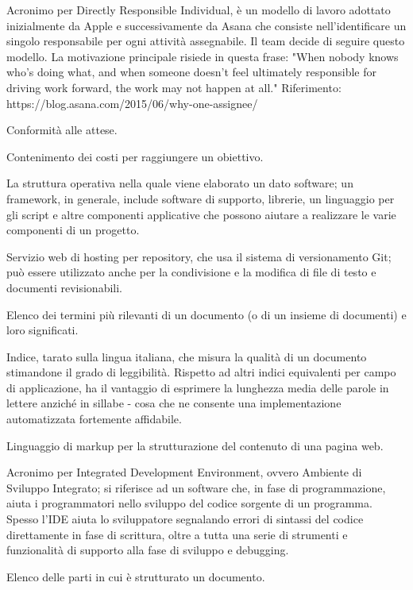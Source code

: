\item[DRI] Acronimo per Directly Responsible Individual, è un modello di lavoro adottato inizialmente da Apple e successivamente da Asana che consiste nell'identificare un singolo responsabile per ogni attività assegnabile. Il team decide di seguire questo modello. La motivazione principale risiede in questa frase: "When nobody knows who’s doing what, and when someone doesn’t feel ultimately responsible for driving work forward, the work may not happen at all." Riferimento: https://blog.asana.com/2015/06/why-one-assignee/ 
\item[Efficacia] Conformità alle attese.
\item[Efficienza] Contenimento dei costi per raggiungere un obiettivo.
\item[Framework]  La struttura operativa nella quale viene elaborato un dato software; un framework, in generale, include software di supporto, librerie, un linguaggio per gli script e altre componenti applicative che possono aiutare a realizzare le varie componenti di un progetto.
\item[GitHub] Servizio web di hosting per repository, che usa il sistema di versionamento Git; può essere utilizzato anche per la condivisione e la modifica di file di testo e documenti revisionabili.
\item[Glossario] Elenco dei termini più rilevanti di un documento (o di un insieme di documenti) e loro significati.
\item[Gulpease, indice di] Indice, tarato sulla lingua italiana, che misura la qualità di un documento stimandone il grado di leggibilità. Rispetto ad altri indici equivalenti per campo di applicazione, ha il vantaggio di esprimere la lunghezza media delle parole in lettere anziché in sillabe - cosa che ne consente una implementazione automatizzata fortemente affidabile. 
\item[HTML5] Linguaggio di markup per la strutturazione del contenuto di una pagina web.
\item[IDE]  Acronimo per Integrated Development Environment, ovvero Ambiente di Sviluppo Integrato; si riferisce ad un software che, in fase di programmazione, aiuta i programmatori nello sviluppo del codice sorgente di un programma. Spesso l'IDE aiuta lo sviluppatore segnalando errori di sintassi del codice direttamente in fase di scrittura, oltre a tutta una serie di strumenti e funzionalità di supporto alla fase di sviluppo e debugging.
\item[Indice generale] Elenco delle parti in cui è strutturato un documento.
